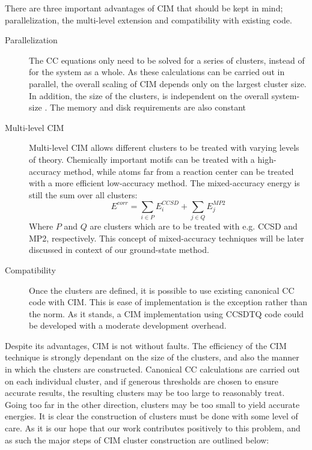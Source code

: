 There are three important advantages of CIM that should be kept in mind; parallelization, the multi-level extension and compatibility with existing code.
\begin{description}
\item[Parallelization] The CC equations only need to be solved for a series of clusters, instead of for the system as a whole. As these calculations can be carried out in parallel, the overall scaling of CIM depends only on the largest cluster size. In addition, the size of the clusters, is independent on the overall system-size \cite{doi:10.1080/00268976.2016.1139755}. The memory and disk requirements are also constant
\item[Multi-level CIM] Multi-level CIM allows different clusters to be treated with varying levels of theory.  Chemically important motifs can be treated with a high-accuracy method, while atoms far from a reaction center can be treated with a more efficient low-accuracy method. The mixed-accuracy energy is still the sum over all clusters: 
\begin{equation}
E^{corr} = \sum_{i \in P} E^{CCSD}_i + \sum_{j \in Q} E^{MP2}_j
\end{equation}
Where $P$ and $Q$ are clusters which are to be treated with e.g. CCSD and MP2, respectively.
This concept of mixed-accuracy techniques will be later discussed in context of our ground-state method.
\item[Compatibility] Once the clusters are defined, it is possible to use existing canonical CC code with CIM. This is ease of implementation is the exception rather than the norm. As it stands, a CIM implementation using CCSDTQ code could be developed with a moderate development overhead. 

\end{description}
Despite its advantages, CIM is not without faults. The efficiency of the CIM technique is strongly dependant on the size of the clusters, and also the manner in which the clusters are constructed. Canonical CC calculations are carried out on each individual cluster, and if generous thresholds are chosen to ensure accurate results, the resulting clusters may be too large to reasonably treat. Going too far in the other direction, clusters may be too small to yield accurate energies. It is clear the construction of clusters must be done with some level of care. As it is our hope that our work contributes positively to this problem, and as such the major steps of CIM cluster construction are outlined below: 
